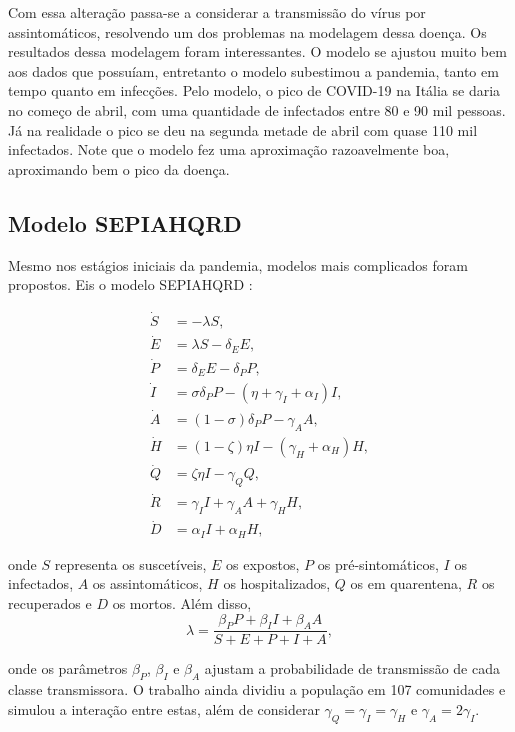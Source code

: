 \documentclass{article}
\begin{document}
Com essa alteração passa-se a considerar a transmissão do vírus por assintomáticos, resolvendo um dos problemas na modelagem dessa doença. Os resultados dessa modelagem foram interessantes. O modelo se ajustou muito bem aos dados que possuíam, entretanto o modelo subestimou a pandemia, tanto em tempo quanto em infecções. Pelo modelo, o pico de COVID-19 na Itália se daria no começo de abril, com uma quantidade de infectados entre 80 e 90 mil pessoas. Já na realidade o pico se deu na segunda metade de abril com quase 110 mil infectados. Note que o modelo fez uma aproximação razoavelmente boa, aproximando bem o pico da doença.

\subsection{Modelo SEPIAHQRD}
Mesmo nos estágios iniciais da pandemia, modelos mais complicados foram propostos. Eis o modelo SEPIAHQRD \cite{Gatto10484}:

\begin{equation*}
    \begin{split}
        \dot{S} & = -\lambda S,\\
        \dot{E} & = \lambda S - \delta_E E, \\
        \dot{P} & = \delta_E E - \delta_P P, \\
        \dot{I} & = \sigma \delta_P P - (\eta + \gamma_I + \alpha_I) I, \\
        \dot{A} & = (1-\sigma) \delta_P P - \gamma_A A, \\
        \dot{H} & = (1-\zeta) \eta I - (\gamma_H + \alpha_H) H, \\
        \dot{Q} & = \zeta \eta I - \gamma_Q Q, \\
        \dot{R} & = \gamma_I I + \gamma_A A + \gamma_H H, \\
        \dot{D} & = \alpha_I I + \alpha_H H,
    \end{split}
\end{equation*}

\noindent onde $S$ representa os suscetíveis, $E$ os expostos, $P$ os pré-sintomáticos, $I$ os infectados, $A$ os assintomáticos, $H$ os hospitalizados, $Q$ os em quarentena, $R$ os recuperados e $D$ os mortos. Além disso, 
\[\lambda = \frac{\beta_P P + \beta_I I + \beta_A A}{S+E+P+I+A},\]

\noindent onde os parâmetros $\beta_P$, $\beta_I$ e $\beta_A$ ajustam a probabilidade de transmissão de cada classe transmissora. O trabalho ainda dividiu a população em 107 comunidades e simulou a interação entre estas, além de considerar $\gamma_Q = \gamma_I = \gamma_H$ e $\gamma_A = 2\gamma_I$.
\end{document}
